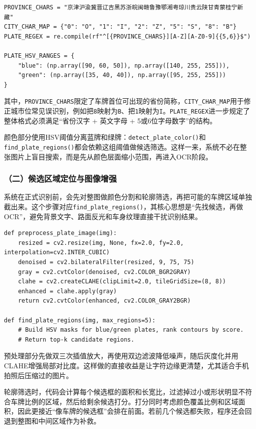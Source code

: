 \documentclass[12pt,a4paper]{article}
\begin{document}
\begin{lstlisting}
PROVINCE_CHARS = "京津沪渝冀晋辽吉黑苏浙皖闽赣鲁豫鄂湘粤琼川贵云陕甘青蒙桂宁新藏"
CITY_CHAR_MAP = {"0": "O", "1": "I", "2": "Z", "5": "S", "8": "B"}
PLATE_REGEX = re.compile(rf"^[{PROVINCE_CHARS}][A-Z][A-Z0-9]{{5,6}}$")

PLATE_HSV_RANGES = {
    "blue": (np.array([90, 60, 50]), np.array([140, 255, 255])),
    "green": (np.array([35, 40, 40]), np.array([95, 255, 255]))
}
\end{lstlisting}

其中，\texttt{PROVINCE\_CHARS}限定了车牌首位可出现的省份简称，\texttt{CITY\_CHAR\_MAP}用于修正城市位常见误识别，例如把\texttt{8}映射为\texttt{B}、把\texttt{1}映射为\texttt{I}。\texttt{PLATE\_REGEX}进一步规定了整体格式必须满足“省份汉字 + 英文字母 + 5或6位字母数字”的结构。

颜色部分使用HSV阈值分离蓝牌和绿牌：\texttt{detect\_plate\_color()}和\texttt{find\_plate\_regions()}都会依赖这组阈值做候选筛选。这样一来，系统不必在整张图片上盲目搜索，而是先从颜色层面缩小范围，再进入OCR阶段。

\subsubsection*{（二）候选区域定位与图像增强}
系统在正式识别前，会先对整图做颜色分割和轮廓筛选，再把可能的车牌区域单独截出来。这个步骤对应\texttt{find\_plate\_regions()}，其核心思想是“先找候选，再做OCR”，避免背景文字、路面反光和车身纹理直接干扰识别结果。

\begin{lstlisting}
def preprocess_plate_image(img):
    resized = cv2.resize(img, None, fx=2.0, fy=2.0, interpolation=cv2.INTER_CUBIC)
    denoised = cv2.bilateralFilter(resized, 9, 75, 75)
    gray = cv2.cvtColor(denoised, cv2.COLOR_BGR2GRAY)
    clahe = cv2.createCLAHE(clipLimit=2.0, tileGridSize=(8, 8))
    enhanced = clahe.apply(gray)
    return cv2.cvtColor(enhanced, cv2.COLOR_GRAY2BGR)

def find_plate_regions(img, max_regions=5):
    # Build HSV masks for blue/green plates, rank contours by score.
    # Return top-k candidate regions.
\end{lstlisting}

预处理部分先做双三次插值放大，再使用双边滤波降低噪声，随后灰度化并用CLAHE增强局部对比度。这样做的直接收益是让字符边缘更清楚，尤其适合手机拍照后压缩过的图片。

轮廓筛选时，代码会计算每个候选框的面积和长宽比，过滤掉过小或形状明显不符合车牌比例的区域，然后给剩余候选打分。打分同时考虑颜色覆盖比例和区域面积，因此更接近“像车牌的候选框”会排在前面。若前几个候选都失败，程序还会回退到整图和中间区域作为补救。
\end{document}
